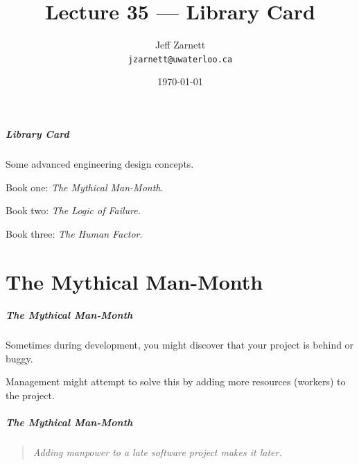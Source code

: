 
\usepackage{tikz-3dplot}

\title{Lecture 35 --- Library Card}

\author{Jeff Zarnett \\ \small \texttt{jzarnett@uwaterloo.ca}}
\date{\today}



\begin{frame}
  \titlepage
\end{frame}


\begin{frame}
\frametitle{Library Card}
\begin{changemargin}{1cm}
Some advanced engineering design concepts.

Book one: \emph{The Mythical Man-Month}.

Book two: \emph{The Logic of Failure}. 

Book three: \emph{The Human Factor}. 

\end{changemargin}
\end{frame}

\part{The Mythical Man-Month}
\frame{\partpage}

\begin{frame}
\frametitle{The Mythical Man-Month}
\begin{changemargin}{1cm}

Sometimes during development, you might discover that your project is behind or buggy. 

Management might attempt to solve this by adding more resources (workers) to the project.
\end{changemargin}
\end{frame}

\begin{frame}
\frametitle{The Mythical Man-Month}
\begin{changemargin}{0.1cm}

\begin{quote}
	\textit{Adding manpower to a late software project makes it later.}
\end{quote}
\end{changemargin}
\end{frame}

